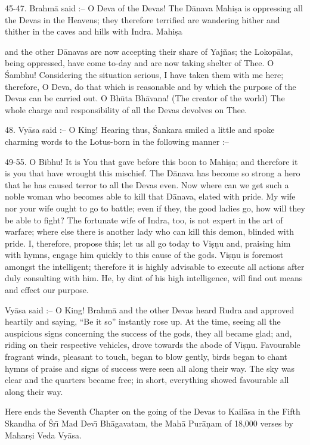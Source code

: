 45-47. Brahm\=a said :-- O Deva of the Devas! The D\=anava Mahi\d{s}a is oppressing all the Devas in the Heavens; they therefore terrified are wandering hither and thither in the caves and hills with Indra. Mahi\d{s}a

and the other D\=anavas are now accepting their share of Yaj\~nas; the Lokop\=alas, being oppressed, have come to-day and are now taking shelter of Thee. O \'Sambhu! Considering the situation serious, I have taken them with me here; therefore, O Deva, do that which is reasonable and by which the purpose of the Devas can be carried out. O Bh\=uta Bh\=avana! (The creator of the world) The whole charge and responsibility of all the Devas devolves on Thee.

48. Vy\=asa said :-- O King! Hearing thus, \'Sankara smiled a little and spoke charming words to the Lotus-born in the following manner :--

49-55. O Bibhu! It is You that gave before this boon to Mahi\d{s}a; and therefore it is you that have wrought this mischief. The D\=anava has become so strong a hero that he has caused terror to all the Devas even. Now where can we get such a noble woman who becomes able to kill that D\=anava, elated with pride. My wife nor your wife ought to go to battle; even if they, the good ladies go, how will they be able to fight? The fortunate wife of Indra, too, is not expert in the art of warfare; where else there is another lady who can kill this demon, blinded with pride. I, therefore, propose this; let us all go today to Vi\d{s}\d{n}u and, praising him with hymns, engage him quickly to this cause of the gods. Vi\d{s}\d{n}u is foremost amongst the intelligent; therefore it is highly advisable to execute all actions after duly consulting with him. He, by dint of his high intelligence, will find out means and effect our purpose.

Vy\=asa said :-- O King! Brahm\=a and the other Devas heard Rudra and approved heartily and saying, ``Be it so'' instantly rose up. At the time, seeing all the auspicious signs concerning the success of the gods, they all became glad; and, riding on their respective vehicles, drove towards the abode of Vi\d{s}\d{n}u. Favourable fragrant winds, pleasant to touch, began to blow gently, birds began to chant hymns of praise and signs of success were seen all along their way. The sky was clear and the quarters became free; in short, everything showed favourable all along their way.

Here ends the Seventh Chapter on the going of the Devas to Kail\=asa in the Fifth Skandha of \'Sr\={\i} Mad Dev\={\i} Bh\=agavatam, the Mah\=a Pur\=a\d{n}am of 18,000 verses by Mahar\d{s}i Veda Vy\=asa.



